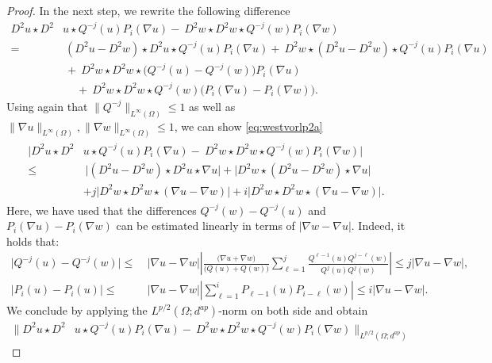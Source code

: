 \documentclass[12pt,a4paper,twoside]{article}
\newcommand {\cb}[1] {\tikz[baseline=(char.base)]{
            \node[shape=circle,draw,inner sep=2pt] (char) {\itshape{\textbf{#1}}};}}
\begin{document}
\begin{proof}
\noindent\cb 2 
In the next step,  we rewrite the following difference
\begin{align*}
    D^2 u \star D^2 & u \star  Q^{-j}(u)P_{i}(\nabla u)  
    -\ D^2 w \star D^2 w \star  Q^{-j}(w)P_{i}(\nabla w) 
    \\ = &\ (D^2 u -D^2 w)\star D^2  u \star  Q^{-j}(u)P_{i}(\nabla u)  
    +\ D^2 w \star (D^2 u - D^2 w) \star  Q^{-j}(u)P_{i}(\nabla u) \\
    &\ +\ D^2 w\star D^2 w \star \big( Q^{-j}(u)- Q^{-j}(w) \big)P_{i}(\nabla u)  
   \\
   &\ \quad  +\ D^2 w \star D^2 w \star Q^{-j}(w) \big(P_{i}(\nabla u)-P_i(\nabla w)\big). 
\end{align*}
Using again that $\| Q^{-j}\|_{L^\infty({\Omega})}  \le 1 $ as well as $\|\nabla u\|_{L^\infty({\Omega})},\|\nabla w\|_{L^\infty({\Omega})}\le 1$, we can show \eqref{eq:westvorlp2a}
\begin{align}
\begin{aligned}
    \big| D^2 u \star D^2 & u \star  Q^{-j}(u)P_{i}(\nabla u)  
    -\ D^2 w \star D^2 w \star  Q^{-j}(w)P_{i}(\nabla w) \big| 
    \\ \le &\    \big| (D^2u-D^2w) \star D^2 u\star \nabla u\big|
    +  \big|D^2 w \star (D^2 u-D^2w )\star\nabla u \big|\\
    & + j \big| D^2 w \star D^2 w\star (\nabla u- \nabla w) \big|
     + i \big| D^2 w \star D^2 w\star (\nabla u- \nabla w) \big|.
\end{aligned}
\end{align}
Here, we have used that the differences $Q^{-j}(w)-Q^{-j}(u)$ and $P_{i}(\nabla u)-P_i(\nabla w)$ can be estimated linearly in terms of  $|\nabla w - \nabla u|$. Indeed, it holds that:
\begin{align*}
   \big| Q^{-j}(u)-Q^{-j}(w) \big| \le & \ \big| \nabla u - \nabla w \big| \left|\frac{\big(\nabla u +\nabla w\big)}{\Big(Q(u) + Q(w)\Big)}\sum_{\ell=1}^{j}\frac{Q^{\ell-1}(u)Q^{j-\ell}(w)}{Q^j(u) Q^j(w)}\right|
   \le j\big| \nabla u - \nabla w \big|,\\
    \big| P_i(u)-P_i(u) \big| \le & \ \big| \nabla u - \nabla w \big| \left|\sum_{\ell=1}^{i}P_{\ell-1}(u)P_{i-\ell}(w)\right|
   \le i\big| \nabla u - \nabla w \big|.
\end{align*}
We conclude by applying the $L^{p/2}(\Omega;d^{ap})$-norm on both side and obtain
\begin{align*}
    \Big\| D^2 u \star D^2 & u \star  Q^{-j}(u)P_{i}(\nabla u)  
    -\ D^2 w \star D^2 w \star  Q^{-j}(w)P_{i}(\nabla w) \Big\|_{L^{p/2}(\Omega;d^{ap})} 

\end{align*}
\end{proof}
\end{document}
